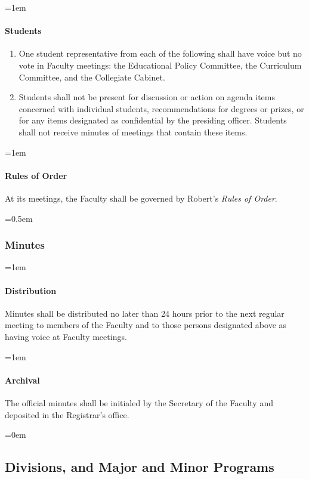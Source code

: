 \documentclass{manual}
\let\oldsubsection\subsection
\renewcommand\subsection{\leftskip=0em\oldsubsection}
\let\oldsubsubsection\subsubsection
\renewcommand\subsubsection{\leftskip=0.5em\oldsubsubsection}
\let\oldparagraph\paragraph
\renewcommand\paragraph{\leftskip=1em\oldparagraph}
\newcommand{\itemLevelA}{\alph*.}
\newcommand{\itemRefA}{\alph*}
\begin{document}
\paragraph{Students}
\begin{enumerate}[label=\itemLevelA,ref=\itemRefA]
\item One student representative from each of the following shall have voice but no vote in Faculty meetings: the Educational Policy Committee, the Curriculum Committee, and the Collegiate Cabinet.
\item Students shall not be present for discussion or action on agenda items concerned with individual students, recommendations for degrees or prizes, or for any items designated as confidential by the presiding officer. Students shall not receive minutes of meetings that contain these items.
\end{enumerate}

\paragraph{Rules of Order}
At its meetings, the Faculty shall be governed by Robert's \emph{Rules of Order}. 

\subsubsection{Minutes}
\paragraph{Distribution} 
Minutes shall be distributed no later than 24 hours prior to the next regular meeting to members of the Faculty and to those persons designated above as having voice at Faculty meetings.

\paragraph{Archival} 
The official minutes shall be initialed by the Secretary of the Faculty and deposited in the Registrar's office.

\subsection{Divisions, and Major and Minor Programs}\label{sec:DivisionsAndMajorAndMinorPrograms}
\end{document}
